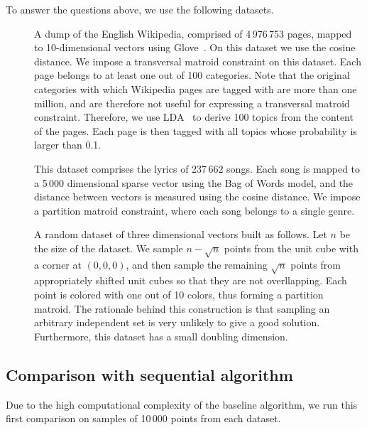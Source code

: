 To answer the questions above, we use the following datasets.
\begin{description}
    \item[] A dump of the English Wikipedia, comprised of 4\,976\,753 pages, 
        mapped to 10-dimensional vectors using Glove~\cite{missing}.
        On this dataset we use the cosine distance.
        We impose a transversal matroid constraint on this dataset. Each page belongs 
        to at least one out of 100 categories. Note that the original categories with which
        Wikipedia pages are tagged with are more than one million, and are therefore not useful
        for expressing a transversal matroid constraint. Therefore, we use LDA~\cite{missing}
        to derive 100 topics from the content of the pages. Each page is then tagged with all
        topics whose probability is larger than 0.1.
    \item[] This dataset comprises the lyrics of 237\,662 songs. Each song is mapped
        to a 5\,000 dimensional sparse vector using the Bag of Words model, and the distance between
        vectors is measured using the cosine distance.
        We impose a partition matroid constraint, where each song belongs to a single genre.
    \item[] A random dataset of three dimensional vectors built as follows. 
        Let $n$ be the size of the dataset. We sample $n-\sqrt{n}$ points from the unit cube
        with a corner at $(0,0,0)$, and then sample the remaining $\sqrt{n}$ points from
        appropriately shifted unit cubes so that they are not overllapping.
        Each point is colored with one out of 10 colors, thus forming a partition matroid.
        The rationale behind this construction is that sampling an arbitrary independent set is very unlikely 
        to give a good solution.
        Furthermore, this dataset has a small doubling dimension.
\end{description}

\subsection{Comparison with sequential algorithm}


Due to the high computational complexity of the baseline algorithm, we run this first comparison 
on samples of 10\,000 points from each dataset.


